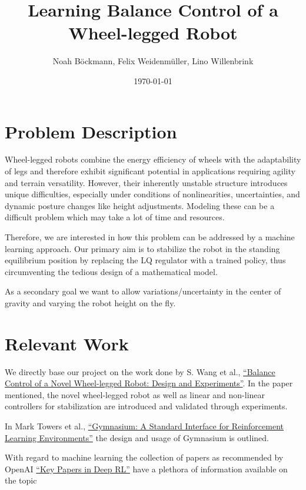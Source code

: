 \documentclass[10pt, a4paper]{article}
\title{\vspace{-1.5cm}Learning Balance Control of a Wheel-legged Robot}
\author{Noah Böckmann, Felix Weidenmüller, Lino Willenbrink}
\date{\today}
\begin{document}
\maketitle
\section{Problem Description}
Wheel-legged robots combine the energy efficiency of wheels with the adaptability of legs and
therefore exhibit significant potential in applications requiring agility and terrain versatility.
However, their inherently unstable structure introduces unique difficulties, especially under
conditions of nonlinearities, uncertainties, and dynamic posture changes like height adjustments.
Modeling these can be a difficult problem which may take a lot of time and resources.

Therefore, we are interested in how this problem can be addressed by a machine learning approach.
Our primary aim is to stabilize the robot in the standing equilibrium position by replacing the LQ
regulator with a trained policy, thus circumventing the tedious design of a mathematical model.

As a secondary goal we want to allow variations/uncertainty in the center of gravity and varying the
robot height on the fly.

\section{Relevant Work}
We directly base our project on the work done by S. Wang et al.,
\hyperref{https://ieeexplore.ieee.org/document/9561579}{}{}{``Balance Control of a Novel
Wheel-legged Robot: Design and Experiments''}. In the paper mentioned,
the novel wheel-legged robot as well as linear and non-linear controllers for stabilization are
introduced and validated through experiments.

In Mark Towers et al.,
\hyperref{https://arxiv.org/abs/2407.17032}{}{}{``Gymnasium: A Standard Interface for Reinforcement
Learning Environments''} the design and usage of Gymnasium is outlined.

With regard to machine learning the collection of papers as recommended by OpenAI 
\hyperref{https://spinningup.openai.com/en/latest/spinningup/keypapers.html}{}{}{``Key Papers in Deep RL''}
have a plethora of information available on the topic
\end{document}
